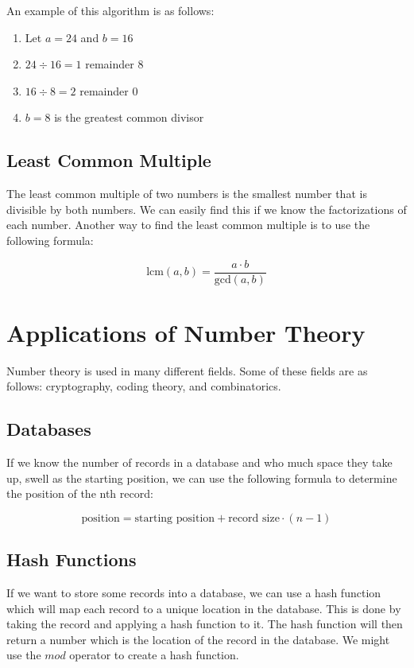\documentclass[11pt]{article}
\begin{document}
An example of this algorithm is as follows:
\begin{enumerate}
\item Let \(a = 24\) and \(b = 16\)
\item \(24 \div 16 = 1\) remainder \(8\)
\item \(16 \div 8 = 2\) remainder \(0\)
\item \(b = 8\) is the greatest common divisor
\end{enumerate}

\subsection{Least Common Multiple}
\label{sec:org89f0f1d}
The least common multiple of two numbers is the smallest number that is divisible by both numbers. We can easily find this if we know the factorizations of each number. Another way to find the least common multiple is to use the following formula:

\[
\text{lcm}(a, b) = \frac{a \cdot b}{\text{gcd}(a, b)}
\]

\section{Applications of Number Theory}
\label{sec:org3296a51}
Number theory is used in many different fields. Some of these fields are as follows: cryptography, coding theory, and combinatorics.

\subsection{Databases}
\label{sec:orgbfb9dd9}
If we know the number of records in a database and who much space they take up, swell as the starting position, we can use the following formula to determine the position of the nth record:

\[
\text{position} = \text{starting position} + \text{record size} \cdot (n - 1)
\]

\subsection{Hash Functions}
\label{sec:orge8e8007}
If we want to store some records into a database, we can use a hash function which will map each record to a unique location in the database. This is done by taking the record and applying a hash function to it. The hash function will then return a number which is the location of the record in the database. We might use the \(mod\) operator to create a hash function.
\end{document}
